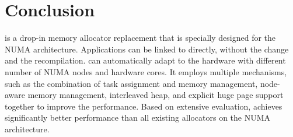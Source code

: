 \section{Conclusion}
\label{sec:conclusion}

\NM{} is a drop-in memory allocator replacement that is specially designed for the NUMA architecture. Applications can be linked to \NM{} directly, without the change and the recompilation. \NM{} can  automatically adapt to the hardware with different number of NUMA nodes and hardware cores. It employs multiple mechanisms, such as the combination of task assignment and memory management, node-aware memory management, interleaved heap, and explicit huge page support together to improve the performance. Based on extensive evaluation, \NM{} achieves significantly better performance than all existing allocators on the NUMA architecture.  